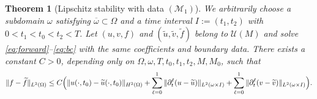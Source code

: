 \documentclass[10pt,a4paper]{amsart}
\newtheorem{theorem}{Theorem}
\newcommand{\ooo}{\overline}
\begin{document}
\begin{theorem}[Lipschitz stability with data $(\mathcal{M}_1)$]
\label{thm:reference}
We arbitrarily choose 
a subdomain $\omega$ satisfying $\ooo{\omega} \subset\Omega$ and 
a time interval $I:= (t_1, t_2)$ with $0<t_1<t_0<t_2<T$.
Let $(u,v,f)$ and $(\widetilde u,\widetilde v,\widetilde f)$ belong to
$\mathcal U(M)$ and solve \eqref{eq:forward}--\eqref{eq:bc} with the
same coefficients and boundary data.
There exists a constant $C>0$, depending only on
$\Omega,\omega,T,t_0,t_1,t_2,M,M_0$, such that
\begin{equation}\label{eq:stab-reference}
\|f-\widetilde f\|_{L^2(\Omega)}
\le C\Bigl(
\|u(\cdot,t_0)-\widetilde u(\cdot,t_0)\|_{H^2(\Omega)}
+\sum_{\ell=0}^1 \|\partial_t^\ell(u-\widetilde u)\|_{L^2(\omega\times I)}
+\sum_{\ell=0}^1 \|\partial_t^\ell(v-\widetilde v)\|_{L^2(\omega\times I)}
\Bigr).
\end{equation}
\end{theorem}
\end{document}
